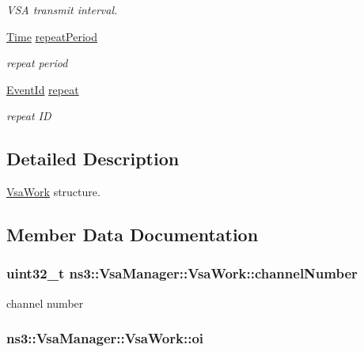 \begin{DoxyCompactItemize}
\begin{DoxyCompactList}\small\item\em V\+SA transmit interval. \end{DoxyCompactList}\item 
\hyperlink{classns3_1_1Time}{Time} \hyperlink{structns3_1_1VsaManager_1_1VsaWork_a7723f0d865fb006dbe98ecdbf714e7f4}{repeat\+Period}
\begin{DoxyCompactList}\small\item\em repeat period \end{DoxyCompactList}\item 
\hyperlink{classns3_1_1EventId}{Event\+Id} \hyperlink{structns3_1_1VsaManager_1_1VsaWork_a8f1b5b38ad12d598817ed60821ebf87b}{repeat}
\begin{DoxyCompactList}\small\item\em repeat ID \end{DoxyCompactList}\end{DoxyCompactItemize}


\subsection{Detailed Description}
\hyperlink{structns3_1_1VsaManager_1_1VsaWork}{Vsa\+Work} structure. 

\subsection{Member Data Documentation}
\subsubsection[{\texorpdfstring{channel\+Number}{channelNumber}}]{\setlength{\rightskip}{0pt plus 5cm}uint32\+\_\+t ns3\+::\+Vsa\+Manager\+::\+Vsa\+Work\+::channel\+Number}\hypertarget{structns3_1_1VsaManager_1_1VsaWork_a83e4289f15a37f16507b7ab115ade42e}{}\label{structns3_1_1VsaManager_1_1VsaWork_a83e4289f15a37f16507b7ab115ade42e}


channel number 

\subsubsection[{\texorpdfstring{oi}{oi}}]{ ns3\+::\+Vsa\+Manager\+::\+Vsa\+Work\+::oi}\hypertarget{structns3_1_1VsaManager_1_1VsaWork_a79c7f68cdc392d3918a45832d9804ed4}{}\label{structns3_1_1VsaManager_1_1VsaWork_a79c7f68cdc392d3918a45832d9804ed4}


